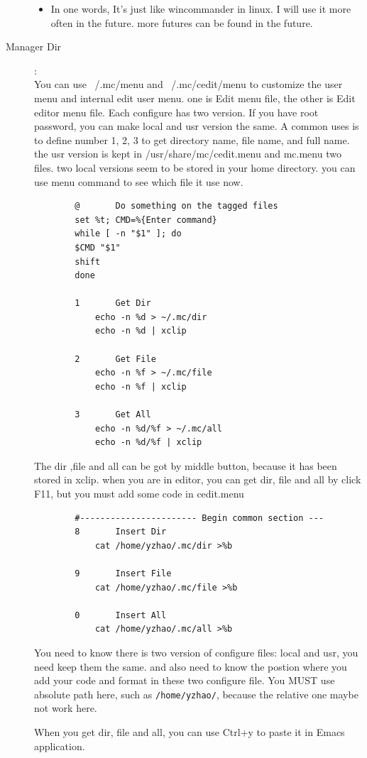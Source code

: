 \documentclass[a4paper,12pt,twoside]{book}
\begin{document}
\begin{CJK*}{UTF8}{song}
\begin{description}
\begin{itemize}
		\item In one words, It's just like wincommander in linux. I will use it more often in the future. more futures can be found in the future.
		\end{itemize}
	\item[Manager Dir]: \\
		You can use ~/.mc/menu and ~/.mc/cedit/menu to customize the user menu and internal edit user menu. one is Edit menu file, the other is Edit editor menu file. Each configure has two version. If you have root password, you can make local and usr version the same. A common uses is to define number 1, 2, 3 to get directory name, file name, and full name.  the usr version is kept in /usr/share/mc/cedit.menu and mc.menu two files. two local versions seem to be stored in your home directory. you can use menu command to see which file it use now. \\
	\begin{verbatim}
		@       Do something on the tagged files
		set %t; CMD=%{Enter command}
		while [ -n "$1" ]; do
		$CMD "$1"
		shift
		done

		1       Get Dir
			echo -n %d > ~/.mc/dir
			echo -n %d | xclip

		2       Get File
			echo -n %f > ~/.mc/file
			echo -n %f | xclip

		3       Get All
			echo -n %d/%f > ~/.mc/all
			echo -n %d/%f | xclip
	\end{verbatim}
	The dir ,file and all can be got by middle button, because it has been stored in xclip.
	when you are in editor, you can get dir, file and all by click F11, but you must add some code in cedit.menu
	\begin{verbatim}	
		#----------------------- Begin common section ---
		8       Insert Dir
			cat /home/yzhao/.mc/dir >%b

		9       Insert File
			cat /home/yzhao/.mc/file >%b

		0       Insert All
			cat /home/yzhao/.mc/all >%b
	\end{verbatim}
	You need to know there is two version of configure files: local and usr, you need keep them the same. and also need to know the postion where you add your code and format in these two configure file. You MUST use absolute path here, such as \verb=/home/yzhao/=, because the relative one maybe not work here. \par
	When you get dir, file and all, you can use Ctrl+y to paste it in Emacs application.
	\end{description}





\end{CJK*}
\end{document}
